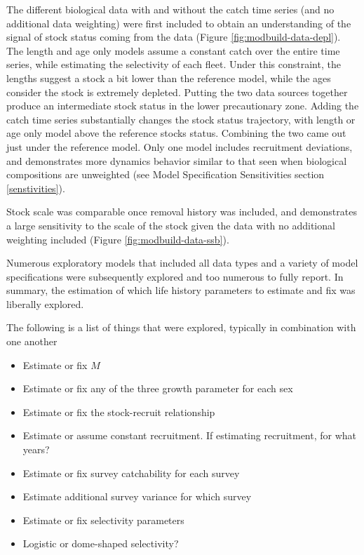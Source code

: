 \documentclass[11pt,
  letterpaper,
]{article}
\providecommand{\tightlist}{%
  \setlength{\itemsep}{0pt}\setlength{\parskip}{0pt}}
\providecommand{\tightlist}{%
  \setlength{\itemsep}{0pt}\setlength{\parskip}{0pt}}
\begin{document}
The different biological data with and without the catch time series (and no additional data weighting) were first included to obtain an understanding of the signal of stock status coming from the data (Figure \ref{fig:modbuild-data-depl}). The length and age only models assume a constant catch over the entire time series, while estimating the selectivity of each fleet. Under this constraint, the lengths suggest a stock a bit lower than the reference model, while the ages consider the stock is extremely depleted. Putting the two data sources together produce an intermediate stock status in the lower precautionary zone. Adding the catch time series substantially changes the stock status trajectory, with length or age only model above the reference stocks status. Combining the two came out just under the reference model. Only one model includes recruitment deviations, and demonstrates more dynamics behavior similar to that seen when biological compositions are unweighted (see Model Specification Sensitivities section \ref{senstivities}).

Stock scale was comparable once removal history was included, and demonstrates a large sensitivity to the scale of the stock given the data with no additional weighting included (Figure \ref{fig:modbuild-data-ssb}).

Numerous exploratory models that included all data types and a variety of model specifications were subsequently explored and too numerous to fully report. In summary, the estimation of which life history parameters to estimate and fix was liberally explored.

The following is a list of things that were explored, typically in combination with one another

\begin{itemize}
\tightlist
\item
  Estimate or fix \(M\)
\item
  Estimate or fix any of the three growth parameter for each sex
\item
  Estimate or fix the stock-recruit relationship
\item
  Estimate or assume constant recruitment. If estimating recruitment, for what years?
\item
  Estimate or fix survey catchability for each survey
\item
  Estimate additional survey variance for which survey
\item
  Estimate or fix selectivity parameters
\item
  Logistic or dome-shaped selectivity?
\end{itemize}
\end{document}
